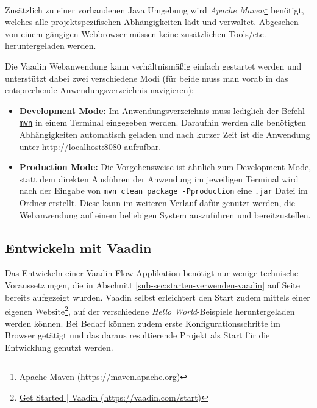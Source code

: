 \documentclass[a4paper,12pt,twoside]{scrreprt}
\begin{document}
Zusätzlich zu einer vorhandenen Java Umgebung wird \textit{Apache Maven}\footnote{\href{https://maven.apache.org/}{Apache Maven (https://maven.apache.org)}} benötigt, welches alle projektspezifischen Abhängigkeiten lädt und verwaltet. Abgesehen von einem gängigen Webbrowser müssen keine zusätzlichen Tools/etc. heruntergeladen werden.

\medskip

Die Vaadin Webanwendung kann verhältnismäßig einfach gestartet werden und unterstützt dabei zwei verschiedene Modi (für beide muss man vorab in das entsprechende Anwendungsverzeichnis navigieren):

\begin{itemize}
    \item \textbf{Development Mode:} Im Anwendungsverzeichnis  muss lediglich der Befehl \underline{\texttt{mvn}} in einem Terminal eingegeben werden. Daraufhin werden alle benötigten Abhängigkeiten automatisch geladen und nach kurzer Zeit ist die Anwendung unter \url{http://localhost:8080} aufrufbar.
    \item \textbf{Production Mode:} Die Vorgehensweise ist ähnlich zum Development Mode, statt dem direkten Ausführen der Anwendung im jeweiligen Terminal wird nach der Eingabe von \underline{\texttt{mvn clean package -Pproduction}} eine \texttt{.jar} Datei im Ordner  erstellt. Diese kann im weiteren Verlauf dafür genutzt werden, die Webanwendung auf einem beliebigen System auszuführen und bereitzustellen.
\end{itemize}

\subsection{Entwickeln mit Vaadin}
\label{sub-sec:entwickeln-vaadin}
Das Entwickeln einer Vaadin Flow Applikation benötigt nur wenige technische Voraussetzungen, die in Abschnitt \ref{sub-sec:starten-verwenden-vaadin} auf Seite \pageref{sub-sec:starten-verwenden-vaadin} bereits aufgezeigt wurden. Vaadin selbst erleichtert den Start zudem mittels einer eigenen Website\footnote{\href{https://vaadin.com/start}{Get Started | Vaadin (https://vaadin.com/start)}}, auf der verschiedene \textit{Hello World}-Beispiele heruntergeladen werden können. Bei Bedarf können zudem erste Konfigurationsschritte im Browser getätigt und das daraus resultierende Projekt als Start für die Entwicklung genutzt werden.

\medskip
\end{document}
